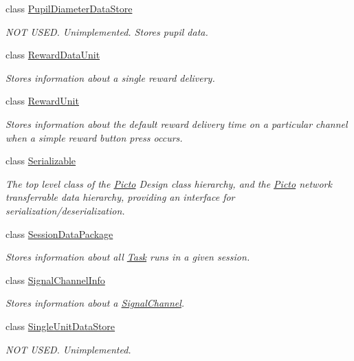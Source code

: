 \begin{DoxyCompactItemize}
class \hyperlink{class_picto_1_1_pupil_diameter_data_store}{Pupil\-Diameter\-Data\-Store}
\begin{DoxyCompactList}\small\item\em N\-O\-T U\-S\-E\-D. Unimplemented. Stores pupil data. \end{DoxyCompactList}\item 
class \hyperlink{class_picto_1_1_reward_data_unit}{Reward\-Data\-Unit}
\begin{DoxyCompactList}\small\item\em Stores information about a single reward delivery. \end{DoxyCompactList}\item 
class \hyperlink{class_picto_1_1_reward_unit}{Reward\-Unit}
\begin{DoxyCompactList}\small\item\em Stores information about the default reward delivery time on a particular channel when a simple reward button press occurs. \end{DoxyCompactList}\item 
class \hyperlink{class_picto_1_1_serializable}{Serializable}
\begin{DoxyCompactList}\small\item\em The top level class of the \hyperlink{namespace_picto}{Picto} Design class hierarchy, and the \hyperlink{namespace_picto}{Picto} network transferrable data hierarchy, providing an interface for serialization/deserialization. \end{DoxyCompactList}\item 
class \hyperlink{class_picto_1_1_session_data_package}{Session\-Data\-Package}
\begin{DoxyCompactList}\small\item\em Stores information about all \hyperlink{class_picto_1_1_task}{Task} runs in a given session. \end{DoxyCompactList}\item 
class \hyperlink{class_picto_1_1_signal_channel_info}{Signal\-Channel\-Info}
\begin{DoxyCompactList}\small\item\em Stores information about a \hyperlink{class_picto_1_1_signal_channel}{Signal\-Channel}. \end{DoxyCompactList}\item 
class \hyperlink{class_picto_1_1_single_unit_data_store}{Single\-Unit\-Data\-Store}
\begin{DoxyCompactList}\small\item\em N\-O\-T U\-S\-E\-D. Unimplemented. \end{DoxyCompactList}\item 

\end{DoxyCompactItemize}
